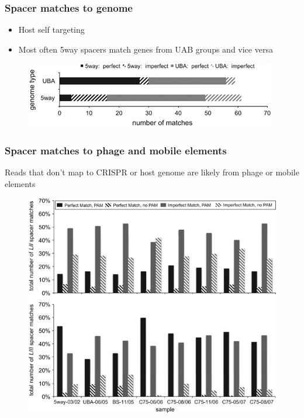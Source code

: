\documentclass[10pt]{beamer}
\begin{document}
\begin{frame}[fragile]
	\frametitle{Spacer matches to genome}
    \begin{itemize}
    	\item Host self targeting
    	\item Most often 5way spacers match genes from UAB groups and vice versa
    \end{itemize}
    \begin{figure}
    		\includegraphics[width=\textwidth,height=0.6\textheight,keepaspectratio]{ismej2_fig4.jpg}
    \end{figure}

\end{frame}
\begin{frame}[fragile]
	\frametitle{Spacer matches to phage and mobile elements}
    Reads that don't map to CRISPR or host genome are likely from phage or mobile elements
    \begin{figure}
    		\includegraphics[width=\textwidth,height=0.6\textheight,keepaspectratio]{ismej_fig5.jpg}
    \end{figure}
    

\end{frame}
\end{document}
